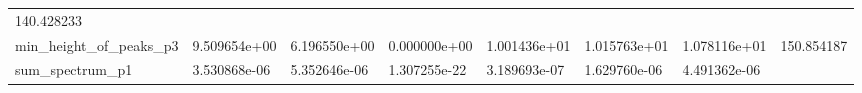 \documentclass[11pt]{article}
\begin{document}
\begin{longtable}[]{@{}llllllll@{}}
\begin{minipage}[t]{0.08\columnwidth}
140.428233\strut
\end{minipage}\tabularnewline
\begin{minipage}[t]{0.16\columnwidth}\raggedright
min\_height\_of\_peaks\_p3\strut
\end{minipage} & \begin{minipage}[t]{0.09\columnwidth}\raggedright
9.509654e+00\strut
\end{minipage} & \begin{minipage}[t]{0.09\columnwidth}\raggedright
6.196550e+00\strut
\end{minipage} & \begin{minipage}[t]{0.09\columnwidth}\raggedright
0.000000e+00\strut
\end{minipage} & \begin{minipage}[t]{0.09\columnwidth}\raggedright
1.001436e+01\strut
\end{minipage} & \begin{minipage}[t]{0.09\columnwidth}\raggedright
1.015763e+01\strut
\end{minipage} & \begin{minipage}[t]{0.09\columnwidth}\raggedright
1.078116e+01\strut
\end{minipage} & \begin{minipage}[t]{0.08\columnwidth}\raggedright
150.854187\strut
\end{minipage}\tabularnewline
\begin{minipage}[t]{0.16\columnwidth}\raggedright
sum\_spectrum\_p1\strut
\end{minipage} & \begin{minipage}[t]{0.09\columnwidth}\raggedright
3.530868e-06\strut
\end{minipage} & \begin{minipage}[t]{0.09\columnwidth}\raggedright
5.352646e-06\strut
\end{minipage} & \begin{minipage}[t]{0.09\columnwidth}\raggedright
1.307255e-22\strut
\end{minipage} & \begin{minipage}[t]{0.09\columnwidth}\raggedright
3.189693e-07\strut
\end{minipage} & \begin{minipage}[t]{0.09\columnwidth}\raggedright
1.629760e-06\strut
\end{minipage} & \begin{minipage}[t]{0.09\columnwidth}\raggedright
4.491362e-06\strut
\end{minipage} & \begin{minipage}[t]{0.08\columnwidth}\raggedright

\end{minipage}
\end{longtable}
\end{document}
